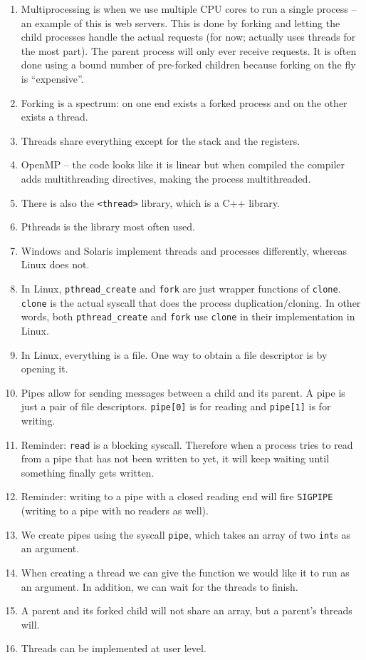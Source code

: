 \documentclass[12pt,a4paper]{article}
\begin{document}
\begin{enumerate}
  \item Multiprocessing is when we use multiple CPU cores to run a single process -- an example of this is web servers. This is done by forking and letting the child processes handle the actual requests (for now; actually uses threads for the most part). The parent process will only ever receive requests. It is often done using a bound number of pre-forked children because forking on the fly is ``expensive''.
  \item Forking is a spectrum: on one end exists a forked process and on the other exists a thread.
  \item Threads share everything except for the stack and the registers.
  \item OpenMP -- the code looks like it is linear but when compiled the compiler adds multithreading directives, making the process multithreaded.
  \item There is also the \texttt{<thread>} library, which is a C++ library.
  \item Pthreads is the library most often used.
  \item Windows and Solaris implement threads and processes differently, whereas Linux does not.
  \item In Linux, \texttt{pthread\_create} and \texttt{fork} are just wrapper functions of \texttt{clone}. \texttt{clone} is the actual syscall that does the process duplication/cloning. In other words, both \texttt{pthread\_create} and \texttt{fork} use \texttt{clone} in their implementation in Linux.
  \item In Linux, everything is a file. One way to obtain a file descriptor is by opening it.
  \item Pipes allow for sending messages between a child and its parent. A pipe is just a pair of file descriptors. \texttt{pipe[0]} is for reading and \texttt{pipe[1]} is for writing.
  \item Reminder: \texttt{read} is a blocking syscall. Therefore when a process tries to read from a pipe that has not been written to yet, it will keep waiting until something finally gets written.
  \item Reminder: writing to a pipe with a closed reading end will fire \texttt{SIGPIPE} (writing to a pipe with no readers as well).
  \item We create pipes using the syscall \texttt{pipe}, which takes an array of two \texttt{int}s as an argument.
  \item When creating a thread we can give the function we would like it to run as an argument. In addition, we can wait for the threads to finish.
  \item A parent and its forked child will not share an array, but a parent's threads will.
  \item Threads can be implemented at user level.
\end{enumerate}
\end{document}
